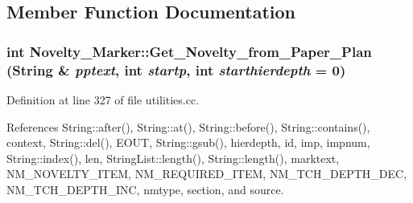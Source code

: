 \subsection{Member Function Documentation}
\subsubsection{\setlength{\rightskip}{0pt plus 5cm}int Novelty\_\-Marker::Get\_\-Novelty\_\-from\_\-Paper\_\-Plan ({\bf String} \& {\em pptext}, int {\em startp}, int {\em starthierdepth} = 0)}\label{classNovelty__Marker_a2}




Definition at line 327 of file utilities.cc.

References String::after(), String::at(), String::before(), String::contains(), context, String::del(), EOUT, String::gsub(), hierdepth, id, imp, impnum, String::index(), len, String\-List::length(), String::length(), marktext, NM\_\-NOVELTY\_\-ITEM, NM\_\-REQUIRED\_\-ITEM, NM\_\-TCH\_\-DEPTH\_\-DEC, NM\_\-TCH\_\-DEPTH\_\-INC, nmtype, section, and source.



